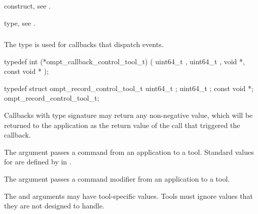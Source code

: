 \begin{crossrefs}
\item {} construct, see .

\item {} type, see .
\end{crossrefs}



\subsubsection{}
\label{sec:ompt_callback_control_tool_t}

\summary
The  type is used for callbacks that 
dispatch  events.

\format

\begin{ccppspecific}
\begin{omptCallback}
typedef int (*ompt_callback_control_tool_t) (
  uint64_t ,
  uint64_t ,
  void *,
  const void *
);
\end{omptCallback}
\end{ccppspecific}

\record
\begin{ccppspecific}
\begin{omptRecord}
typedef struct ompt_record_control_tool_t {
  uint64_t ;
  uint64_t ;
  const void *;
} ompt_record_control_tool_t;
\end{omptRecord}
\end{ccppspecific}

\descr
Callbacks with type signature  may return 
any non-negative value, which will be returned to the application as the return 
value of the  call that triggered the callback.

\argdesc
The  argument passes a command from an application to a tool. 
Standard values for  are defined by  
in .

The  argument passes a command modifier from an application to a tool.

The  and  arguments may have tool-specific values.
Tools must ignore  values that they are not designed to handle.

